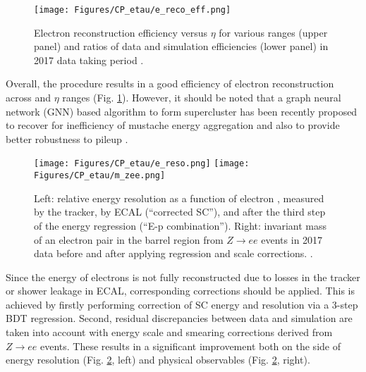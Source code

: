 \begin{figure}[t!]
    \centering
    \texttt{[image: Figures/CP\_etau/e\_reco\_eff.png]}
    \caption{Electron reconstruction efficiency versus $\eta$ for various \pt ranges (upper panel) and ratios of data and simulation efficiencies (lower panel) in 2017 data taking period \cite{CMS:2020uim}.}
    \label{fig:e-reco-eff}
\end{figure}

Overall, the procedure results in a good efficiency of electron reconstruction across \pt and $\eta$ ranges (Fig. \ref{fig:e-reco-eff}). However, it should be noted that a graph neural network (GNN) based algorithm to form supercluster has been recently proposed to recover for inefficiency of mustache energy aggregation and also to provide better robustness to pileup \cite{Valsecchi:2022rla}.

\begin{figure}[ht!]
    \centering
    \texttt{[image: Figures/CP\_etau/e\_reso.png]}
    \texttt{[image: Figures/CP\_etau/m\_zee.png]}
    \caption{Left: relative energy resolution as a function of electron \pt, measured by the tracker, by ECAL (\enquote{corrected SC}), and after the third step of the energy regression (\enquote{E-p combination}). Right: invariant mass of an electron pair in the barrel region from $Z\to ee$ events in 2017 data before and after applying regression and scale corrections. \cite{CMS:2020uim}.}
    \label{fig:e_corr}
\end{figure}

Since the energy of electrons is not fully reconstructed due to losses in the tracker or shower leakage in ECAL, corresponding corrections should be applied. This is achieved by firstly performing correction of SC energy and resolution via a 3-step BDT regression.  Second, residual discrepancies between data and simulation are taken into account with energy scale and smearing corrections derived from $Z \to ee$ events. These results in a significant improvement both on the side of energy resolution (Fig. \ref{fig:e_corr}, left) and physical observables (Fig. \ref{fig:e_corr}, right).

